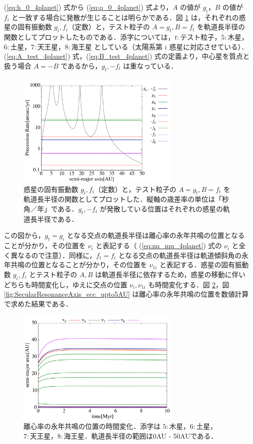 \documentclass[11pt,a4paper,oneside,onecolumn]{jreport}
\begin{document}
(\ref{eq:h_0_4planet}) 式から (\ref{eq:q_0_4planet}) 式より，$A$ の値が $g_i$，$B$ の値が $f_i$ と一致する場合に発散が生じることは明らかである．図 \ref{fig:PrecessionRate} は，それぞれの惑星の固有振動数 $g_i, f_i$（定数）と，テスト粒子の $A = g_t, B = f_t$ を軌道長半径の関数としてプロットしたものである．添字については，$t : テスト粒子$，$5 : 木星$，$6 : 土星$，$7 : 天王星$，$8 : 海王星$ としている（太陽系第 $i$ 惑星に対応させている）．(\ref{eq:A_test_4planet}) 式，(\ref{eq:B_test_4planet}) 式の定義より，中心星を質点と扱う場合 $A = - B$ であるから，$g_t, - f_t$ は重なっている．
\begin{figure}[H]
\centering
\includegraphics[width=8cm]{./image/PrecessionRate_logAB.pdf}
\caption{惑星の固有振動数 $g_i, f_i$（定数）と，テスト粒子の $A = g_t, B = f_t$ を軌道長半径の関数としてプロットした．縦軸の歳差率の単位は「秒角／年」である．$g_t, - f_t$ が発散している位置はそれぞれの惑星の軌道長半径である．\label{fig:PrecessionRate}}
\end{figure}
この図から，$g_t = g_i$ となる交点の軌道長半径は離心率の永年共鳴の位置となることが分かり，その位置を $\nu_i$ と表記する（ (\ref{eq:nu_mu_4planet}) 式の $\nu_i$ と全く異なるので注意）．同様に，$f_t = f_i$ となる交点の軌道長半径は軌道傾斜角の永年共鳴の位置となることが分かり，その位置を $\nu_{1i}$ と表記する．惑星の固有振動数 $g_i, f_i$ とテスト粒子の $A, B$ は軌道長半径に依存するため，惑星の移動に伴いどちらも時間変化し，ゆえに交点の位置 $\nu_i, \nu_{1i}$ も時間変化する．図 \ref{fig:SecularResonanceAxis_ecc}，図 \ref{fig:SecularResonanceAxis_ecc_upto5AU} は離心率の永年共鳴の位置を数値計算で求めた結果である．
\begin{figure}[H]
\centering
\includegraphics[width=8cm]{./image/SecularResonanceAxis_ecc.pdf}
\caption{離心率の永年共鳴の位置の時間変化．添字は $5 : 木星$，$6 : 土星$，$7 : 天王星$，$8 : 海王星$．軌道長半径の範囲は0AU - 50AUである．\label{fig:SecularResonanceAxis_ecc}}
\end{figure}
\end{document}
